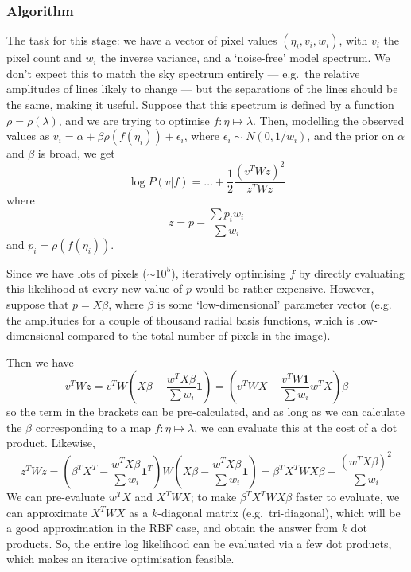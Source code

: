 \subsubsection{Algorithm}
\label{subsubsec:coarseAlignmentAlgorithm}

The task for this stage: we have a vector of pixel values $(\eta_i,
v_i, w_i)$, with $v_i$ the pixel count and $w_i$ the inverse variance,
and a `noise-free' model spectrum. We don't expect this to match the
sky spectrum entirely --- e.g.\ the relative amplitudes of lines 
likely to change --- but the separations of the lines should be the
same, making it useful. Suppose that this spectrum is defined by a function
$\rho = \rho(\lambda)$, and we are trying to optimise $f : \eta \mapsto
\lambda$. Then, modelling the observed values as $v_i = \alpha + \beta
\rho (f (\eta_i)) + \epsilon_i$, where $\epsilon_i \sim N(0,1/w_i)$, and
the prior on $\alpha$ and $\beta$ is broad, we get
\[
\log P(v|f) = \dots + \frac{1}{2} \frac{(v^T W z)^2}{z^T W z}
\]
where
\[
z = p - \frac{\sum p_i w_i}{\sum w_i}
\]
and $p_i = \rho (f (\eta_i))$.

Since we have lots of pixels ($\sim 10^5$), iteratively optimising $f$
by directly evaluating this likelihood at every new value of $p$ would
be rather expensive. However, suppose that $p = X \beta$, where $\beta$
is some `low-dimensional' parameter vector (e.g. the amplitudes for a
couple of thousand radial basis functions, which is low-dimensional
compared to the total number of pixels in the image).

Then we have
\[
v^T W z = v^T W \left(X \beta - \frac{w^T X \beta}{\sum w_i}\mathbf{1}\right)
= \left(v^T W X - \frac{v^T W \mathbf{1}}{\sum w_i} w^T X\right) \beta
\]
so the term in the brackets can be pre-calculated, and as long as we can
calculate the $\beta$ corresponding to a map $f : \eta \mapsto \lambda$,
we can evaluate this at the cost of a dot product. Likewise,
\[
z^T W z = \left(\beta^T X^T - \frac{w^T X \beta}{\sum w_i} \mathbf{1}^T\right)
W \left(X \beta - \frac{w^T X \beta}{\sum w_i} \mathbf{1}\right)
= \beta^T X^T W X \beta - \frac{(w^T X \beta)^2}{\sum w_i}
\] 
We can pre-evaluate $w^T X$ and $X^T W X$; to make $\beta^T X^T
W X \beta$ faster to evaluate, we can approximate $X^T W X$ as a
$k$-diagonal matrix (e.g.\ tri-diagonal), which will be a good
approximation in the RBF case, and obtain the answer from $k$ dot
products. So, the entire log likelihood can be evaluated via a few dot
products, which makes an iterative optimisation feasible.

